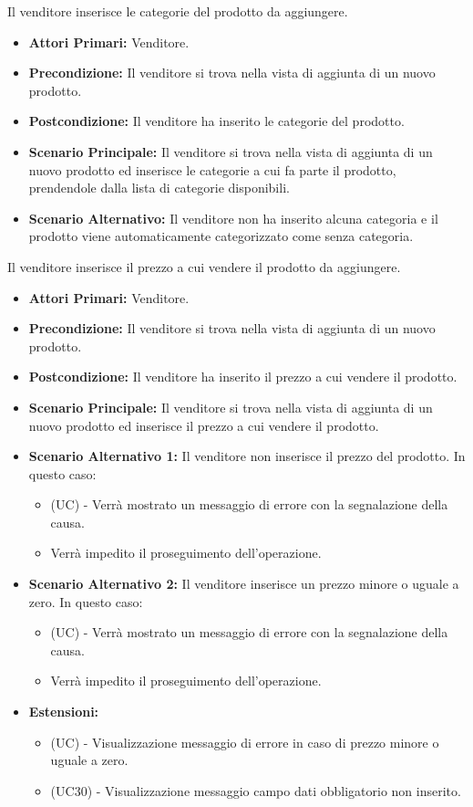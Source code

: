 Il venditore inserisce le categorie del prodotto da aggiungere.
\begin{itemize}
    \item \textbf{Attori Primari:} Venditore.
    \item \textbf{Precondizione:} Il venditore si trova nella vista di aggiunta di un nuovo prodotto.
    \item \textbf{Postcondizione:} Il venditore ha inserito le categorie del prodotto.
    \item \textbf{Scenario Principale:} Il venditore si trova nella vista di aggiunta di un nuovo prodotto ed inserisce le categorie a cui fa parte il prodotto, prendendole dalla lista di categorie disponibili.
    \item \textbf{Scenario Alternativo:} Il venditore non ha inserito alcuna categoria e il prodotto viene automaticamente categorizzato come senza categoria.
\end{itemize}

Il venditore inserisce il prezzo a cui vendere il prodotto da aggiungere.
\begin{itemize}
    \item \textbf{Attori Primari:} Venditore.
    \item \textbf{Precondizione:} Il venditore si trova nella vista di aggiunta di un nuovo prodotto.
    \item \textbf{Postcondizione:} Il venditore ha inserito il prezzo a cui vendere il prodotto.
    \item \textbf{Scenario Principale:} Il venditore si trova nella vista di aggiunta di un nuovo prodotto ed inserisce il prezzo a cui vendere il prodotto.
    \item \textbf{Scenario Alternativo 1:} Il venditore non inserisce il prezzo del prodotto. In questo caso:
    \begin{itemize}
        \item (UC) - Verrà mostrato un messaggio di errore con la segnalazione della causa.
        \item Verrà impedito il proseguimento dell'operazione.
    \end{itemize}
    \item \textbf{Scenario Alternativo 2:} Il venditore inserisce un prezzo minore o uguale a zero. In questo caso:
    \begin{itemize}
        \item (UC) - Verrà mostrato un messaggio di errore con la segnalazione della causa.
        \item Verrà impedito il proseguimento dell'operazione.
    \end{itemize}
    \item \textbf{Estensioni:}
    \begin{itemize}
        \item (UC) - Visualizzazione messaggio di errore in caso di prezzo minore o uguale a zero.
        \item (UC30) - Visualizzazione messaggio campo dati obbligatorio non inserito.
    \end{itemize}
\end{itemize}

